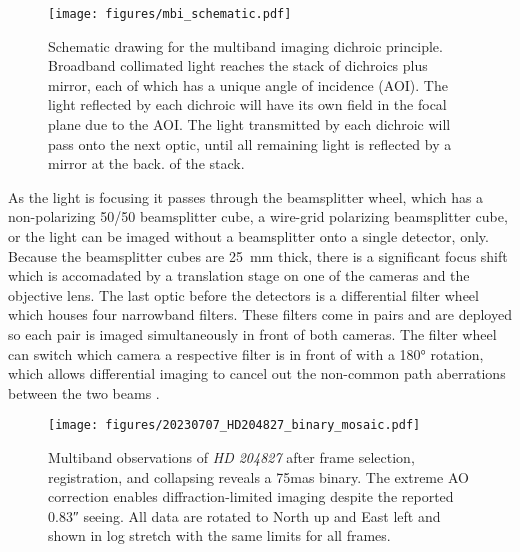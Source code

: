 \begin{figure}
    \centering
    \texttt{[image: figures/mbi\_schematic.pdf]}
    \caption{Schematic drawing for the multiband imaging dichroic principle. Broadband collimated light reaches the stack of dichroics plus mirror, each of which has a unique angle of incidence (AOI). The light reflected by each dichroic will have its own field in the focal plane due to the AOI. The light transmitted by each dichroic will pass onto the next optic, until all remaining light is reflected by a mirror at the back. of the stack.\label{fig:mbi_schematic}}
\end{figure}

As the light is focusing it passes through the beamsplitter wheel, which has a non-polarizing 50/50 beamsplitter cube, a wire-grid polarizing beamsplitter cube, or the light can be imaged without a beamsplitter onto a single detector, only. Because the beamsplitter cubes are \SI{25}{\milli\meter} thick, there is a significant focus shift which is accomadated by a translation stage on one of the cameras and the objective lens. The last optic before the detectors is a differential filter wheel which houses four narrowband filters. These filters come in pairs and are deployed so each pair is imaged simultaneously in front of both cameras. The filter wheel can switch which camera a respective filter is in front of with a \ang{180} rotation, which allows differential imaging to cancel out the non-common path aberrations between the two beams \citep{uyama_high-contrast_2020}.

\begin{figure}
    \centering
    \texttt{[image: figures/20230707\_HD204827\_binary\_mosaic.pdf]}
    \caption{Multiband observations of \textit{HD 204827} after frame selection, registration, and collapsing reveals a \si{75}{mas} binary. The extreme AO correction enables diffraction-limited imaging despite the reported \ang{;;0.83} seeing. All data are rotated to North up and East left and shown in log stretch with the same limits for all frames.\label{fig:binary}}
\end{figure}


